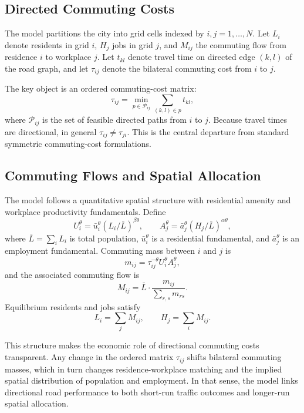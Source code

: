 \documentclass[12pt]{article}
\begin{document}
\subsection{Directed Commuting Costs}
The model partitions the city into grid cells indexed by $i,j = 1,\dots,N$. Let $L_i$ denote residents in grid $i$, $H_j$ jobs in grid $j$, and $M_{ij}$ the commuting flow from residence $i$ to workplace $j$. Let $t_{kl}$ denote travel time on directed edge $(k,l)$ of the road graph, and let $\tau_{ij}$ denote the bilateral commuting cost from $i$ to $j$.

The key object is an ordered commuting-cost matrix:
\[
\tau_{ij} = \min_{p \in \mathcal{P}_{ij}} \sum_{(k,l)\in p} t_{kl},
\]
where $\mathcal{P}_{ij}$ is the set of feasible directed paths from $i$ to $j$. Because travel times are directional, in general $\tau_{ij} \neq \tau_{ji}$. This is the central departure from standard symmetric commuting-cost formulations.

\subsection{Commuting Flows and Spatial Allocation}
The model follows a quantitative spatial structure with residential amenity and workplace productivity fundamentals. Define
\[
U_i^\theta = \bar u_i^\theta (L_i/\bar L)^{\beta\theta},
\qquad
A_j^\theta = \bar a_j^\theta (H_j/\bar L)^{\alpha\theta},
\]
where $\bar L = \sum_i L_i$ is total population, $\bar u_i^\theta$ is a residential fundamental, and $\bar a_j^\theta$ is an employment fundamental. Commuting mass between $i$ and $j$ is
\[
m_{ij} = \tau_{ij}^{-\theta} U_i^\theta A_j^\theta,
\]
and the associated commuting flow is
\[
M_{ij} = \bar L \cdot \frac{m_{ij}}{\sum_{r,s} m_{rs}}.
\]
Equilibrium residents and jobs satisfy
\[
L_i = \sum_j M_{ij},
\qquad
H_j = \sum_i M_{ij}.
\]

This structure makes the economic role of directional commuting costs transparent. Any change in the ordered matrix $\tau_{ij}$ shifts bilateral commuting masses, which in turn changes residence-workplace matching and the implied spatial distribution of population and employment. In that sense, the model links directional road performance to both short-run traffic outcomes and longer-run spatial allocation.
\end{document}
